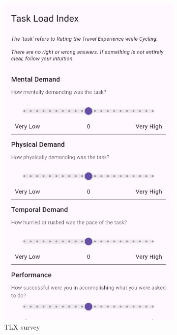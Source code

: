 \begin{figure}[!htb]
\begin{subfigure}{.25\textwidth}
        \includegraphics[width=.8666\linewidth]{images/app_tlx_survey.jpg}
        \caption{TLX survey}
        \label{subfig:app_tlx_survey}
    \end{subfigure}%
    \begin{subfigure}{.25\textwidth}
        \centering

\end{subfigure}
\end{figure}

